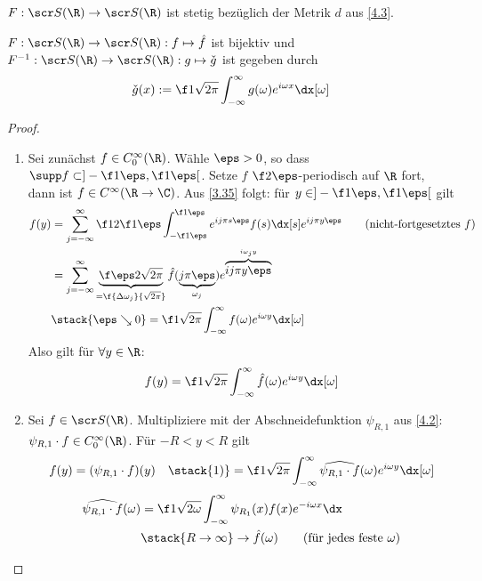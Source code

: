 \begin{nt} \label{4.9}
	$F : \scr S(\R) \to \scr S(\R)$ ist stetig bezüglich der Metrik $d$ aus \ref{4.3}.
\end{nt}

\begin{st} \label{4.10}
	$F: \scr S(\R) \to \scr S(\R): f \mapsto \hat f$ ist bijektiv und $F^{-1}: \scr S(\R) \to \scr S(\R) : g \mapsto \check g$ ist gegeben durch
	\[
		\check g(x) := \f 1{\sqrt{2\pi}} \int_{-\infty}^\infty g(\omega) e^{i \omega x} \dx[\omega]
	\]
	\begin{proof}
		\begin{enumerate}[1)]
			\item
				Sei zunächst $f \in C_0^\infty(\R)$.
				Wähle $\eps > 0$, so dass $\supp f \subset ]-\f 1\eps, \f 1\eps[$.
				Setze $f$ $\f 2\eps$-periodisch auf $\R$ fort, dann ist $f \in C^\infty (\R \to \C)$.
				Aus \ref{3.35} folgt: für $y \in ]-\f 1\eps, \f 1\eps[$ gilt
				\begin{align*}
					f(y) 
					&= \sum_{j=-\infty}^\infty \f 1{2 \f 1\eps} \int_{-\f 1\eps}^{\f 1\eps} e^{ij\pi s \eps} f(s) \dx[s] e^{ij\pi y \eps} \qquad \text{(nicht-fortgesetztes $f$)}\\
					&= \sum_{j=-\infty}^\infty \underbrace{\f \eps 2 \sqrt{2\pi}}_{= \f {\Delta \omega_j}{\sqrt{2\pi}}} \hat f(\underbrace{j\pi \eps}_{\omega_j}) e^{\overbrace{ij\pi y \eps}^{i\omega_j y}} \\
					&\stack{\eps \searrow 0}= \f 1{\sqrt{2\pi}} \int_{-\infty}^\infty f(\omega) e^{i\omega y} \dx[\omega]
				\end{align*}
				Also gilt für $\forall y \in \R$:
				\[
					f(y) = \f 1{\sqrt{2\pi}} \int_{-\infty}^\infty \hat f(\omega) e^{i \omega y} \dx[\omega]
				\]
			\item
				Sei $f \in \scr S(\R)$.
				Multipliziere mit der Abschneidefunktion $\psi_{R,1}$ aus \ref{4.2}: $\psi_{R,1}\cdot f \in C_0^\infty(\R)$.
				Für $-R < y < R$ gilt
				\begin{align*}
					f(y) 
					&= (\psi_{R,1}\cdot f)(y)
					&\stack{1)}= \f 1{\sqrt{2\pi}} \int_{-\infty}^\infty \widehat{\psi_{R,1} \cdot f}(\omega) e^{i\omega y} \dx[\omega]
				\end{align*}
				\begin{align*}
					\widehat{\psi_{R,1} \cdot f}(\omega) 
					&= \f 1{\sqrt{2\omega}} \int_{-\infty}^\infty \psi_{R_1}(x) f(x) e^{-i \omega x} \dx \\
					&\stack{R\to \infty}\to \hat f(\omega)  \qquad \text{(für jedes feste $\omega$)}

\end{align*}
\end{enumerate}
\end{proof}
\end{st}
